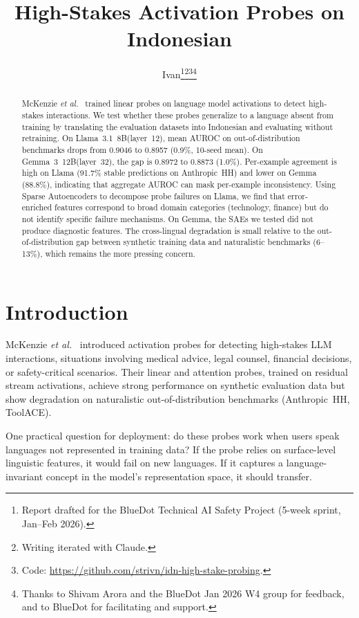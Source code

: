 \documentclass{article}
\title{High-Stakes Activation Probes on Indonesian}
\author{%
  Ivan\thanks{%
    Report drafted for the BlueDot Technical AI Safety Project
    (5-week sprint, Jan--Feb 2026).%
  }\thanks{%
    Writing iterated with Claude.%
  }\thanks{%
    Code: \url{https://github.com/strivn/idn-high-stake-probing}.%
  }\thanks{%
    Thanks to Shivam Arora and the BlueDot Jan 2026 W4 group for
    feedback, and to BlueDot for facilitating and support.%
  } \\
}
\newcommand{\etal}{\textit{et al.}\xspace}
\newcommand{\auroc}{AUROC\xspace}
\newcommand{\llama}{Llama~3.1~8B\xspace}
\newcommand{\gemma}{Gemma~3~12B\xspace}
\begin{document}
\frenchspacing

\maketitle

\begin{abstract}
McKenzie \etal~\cite{mckenzie2025} trained linear probes on language model
activations to detect high-stakes interactions.
We test whether these probes generalize to a language absent from training
by translating the evaluation datasets into Indonesian and evaluating
without retraining.
On \llama (layer~12), mean \auroc on out-of-distribution benchmarks drops
from 0.9046 to 0.8957 (0.9\%, 10-seed mean).
On \gemma (layer~32), the gap is 0.8972 to 0.8873 (1.0\%).
Per-example agreement is high on Llama (91.7\% stable predictions on
Anthropic~HH) and lower on Gemma (88.8\%),
indicating that aggregate \auroc can mask per-example inconsistency.
Using Sparse Autoencoders to decompose probe failures on Llama, we find
that error-enriched features correspond to broad domain categories
(technology, finance) but do not identify specific failure mechanisms.
On Gemma, the SAEs we tested did not produce diagnostic features.
The cross-lingual degradation is small relative to the out-of-distribution
gap between synthetic training data and naturalistic benchmarks (6--13\%),
which remains the more pressing concern.
\end{abstract}

\section{Introduction}
\label{sec:intro}

McKenzie \etal~\cite{mckenzie2025} introduced activation probes for detecting
high-stakes LLM interactions, situations involving medical advice, legal counsel,
financial decisions, or safety-critical scenarios.
Their linear and attention probes, trained on residual stream activations,
achieve strong performance on synthetic evaluation data but show degradation on
naturalistic out-of-distribution benchmarks (Anthropic~HH, ToolACE).

One practical question for deployment: do these probes work when users speak
languages not represented in training data?
If the probe relies on surface-level linguistic features, it would fail on
new languages.
If it captures a language-invariant concept in the model's representation space,
it should transfer.
\end{document}
